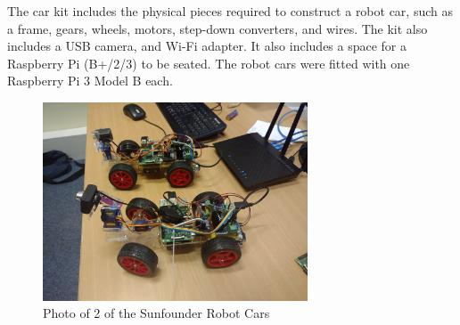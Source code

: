 \documentclass[../dissertation.tex]{subfiles}
\begin{document}
The car kit includes the physical pieces required to construct a robot car, such as a frame, gears, wheels, motors, step-down converters, and wires. The kit also includes a USB camera, and Wi-Fi adapter. It also includes a space for a Raspberry Pi (B+/2/3) to be seated. The robot cars were fitted with one Raspberry Pi 3 Model B each.

\begin{figure}[H]
\centering
\includegraphics[width=0.7\textwidth]{images/background/robot-cars.jpg}
\caption{Photo of 2 of the Sunfounder Robot Cars}
\end{figure}
\end{document}
